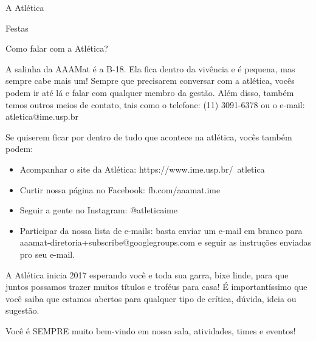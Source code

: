 \begin{secao}{A Atlética}
\begin{subsecao}{Festas}
\end{subsecao}
\begin{subsecao}{Como falar com a Atlética?}

A salinha da AAAMat é a B-18. Ela fica dentro da vivência e é pequena, mas
sempre cabe mais um! Sempre que precisarem conversar com a atlética, vocês
podem ir até lá e falar com qualquer membro da gestão. Além disso, também temos
outros meios de contato, tais como o telefone: (11) 3091-6378 ou o e-mail:
atletica@ime.usp.br

Se quiserem ficar por dentro de tudo que acontece na atlética, vocês também
podem:

\begin{itemize}
  \item Acompanhar o site da Atlética: https://www.ime.usp.br/~atletica
  \item Curtir nossa página no Facebook: fb.com/aaamat.ime
  \item Seguir a  gente no Instagram: @atleticaime
  \item Participar da nossa lista de e-mails: basta enviar um e-mail em branco
        para aaamat-diretoria+subscribe@googlegroups.com e seguir as instruções
        enviadas pro seu e-mail.
\end{itemize}

A Atlética inicia 2017 esperando você e toda sua garra, bixe linde, para que
juntos possamos trazer muitos títulos e troféus para casa! É importantíssimo
que você saiba que estamos abertos para qualquer tipo de crítica, dúvida, ideia
ou sugestão.

Você é SEMPRE muito bem-vindo em nossa sala, atividades, times e eventos!
\end{subsecao}
\end{secao}
